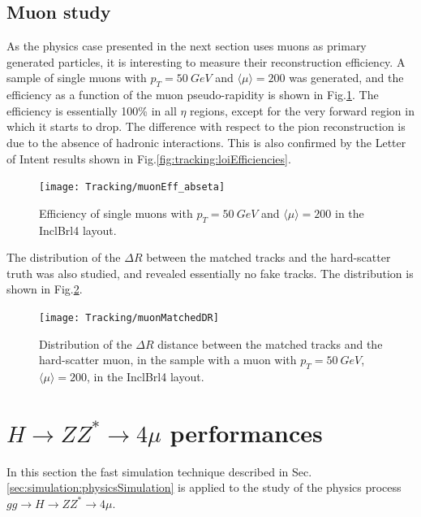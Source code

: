 \documentclass[a4paper,twoside,12pt]{book}
\begin{document}
\section{Muon study}
As the physics case presented
in the next section uses muons as primary generated particles, it is interesting to measure their reconstruction efficiency. A sample of 
single muons with $p_{T} = 50\ GeV$ and $\langle\mu\rangle = 200$ was generated, and the efficiency as a function of the muon pseudo-rapidity is
shown in Fig.\ref{fig:tracking:muonEff_abseta}. The efficiency is essentially 100\% in all $\eta$ regions, except for the very forward region in which it starts to drop.
The difference with respect to the pion reconstruction is due to the absence of hadronic interactions. This is also confirmed by the Letter of Intent\cite{loi} results shown in Fig.\ref{fig:tracking:loiEfficiencies}.\\

\begin{figure}
\centering
\texttt{[image: Tracking/muonEff\_abseta]}
\caption{Efficiency of single muons with $p_{T} = 50\ GeV$ and $\langle\mu\rangle = 200$ in the InclBrl4 layout.}
\label{fig:tracking:muonEff_abseta}
\end{figure} 

The distribution of the $\Delta R$ between the matched tracks and the hard-scatter truth was also studied, and revealed essentially no fake tracks. The distribution is
shown in Fig.\ref{fig:tracking:muonMatchedDR}.\\

\begin{figure}
\centering
\texttt{[image: Tracking/muonMatchedDR]}
\caption{Distribution of the $\Delta R$ distance between the matched tracks and the hard-scatter muon, in the sample with a muon with $p_{T} = 50\ GeV$, $\langle\mu\rangle = 200$, in the InclBrl4 layout.}
\label{fig:tracking:muonMatchedDR}
\end{figure} 


\clearpage

\chapter{$H \rightarrow ZZ^* \rightarrow 4\mu$ performances}
In this section the fast simulation technique described in Sec.\ref{sec:simulation:physicsSimulation} is
applied to the study of the physics process $gg \rightarrow H \rightarrow ZZ^* \rightarrow 4\mu$. \\
\end{document}
